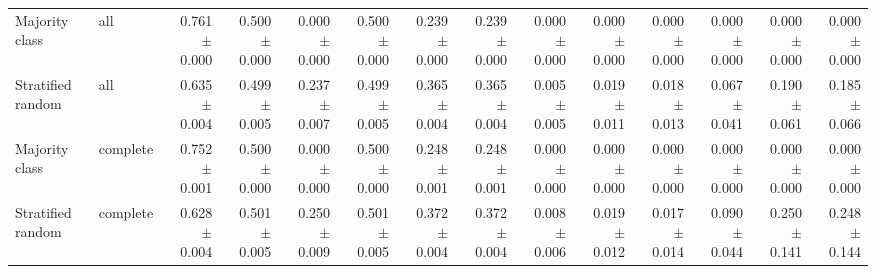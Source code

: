 \begin{table}[t]
{\begin{tabular}{llrrrrrrrrrrrr}
Majority class & all & 0.761 $\pm$ 0.000 & 0.500 $\pm$ 0.000 & 0.000 $\pm$ 0.000 & 0.500 $\pm$ 0.000 & 0.239 $\pm$ 0.000 & 0.239 $\pm$ 0.000 & 0.000 $\pm$ 0.000 & 0.000 $\pm$ 0.000 & 0.000 $\pm$ 0.000 & 0.000 $\pm$ 0.000 & 0.000 $\pm$ 0.000 & 0.000 $\pm$ 0.000 \\
Stratified random & all & 0.635 $\pm$ 0.004 & 0.499 $\pm$ 0.005 & 0.237 $\pm$ 0.007 & 0.499 $\pm$ 0.005 & 0.365 $\pm$ 0.004 & 0.365 $\pm$ 0.004 & 0.005 $\pm$ 0.005 & 0.019 $\pm$ 0.011 & 0.018 $\pm$ 0.013 & 0.067 $\pm$ 0.041 & 0.190 $\pm$ 0.061 & 0.185 $\pm$ 0.066 \\
Majority class & complete & 0.752 $\pm$ 0.001 & 0.500 $\pm$ 0.000 & 0.000 $\pm$ 0.000 & 0.500 $\pm$ 0.000 & 0.248 $\pm$ 0.001 & 0.248 $\pm$ 0.001 & 0.000 $\pm$ 0.000 & 0.000 $\pm$ 0.000 & 0.000 $\pm$ 0.000 & 0.000 $\pm$ 0.000 & 0.000 $\pm$ 0.000 & 0.000 $\pm$ 0.000 \\
Stratified random & complete & 0.628 $\pm$ 0.004 & 0.501 $\pm$ 0.005 & 0.250 $\pm$ 0.009 & 0.501 $\pm$ 0.005 & 0.372 $\pm$ 0.004 & 0.372 $\pm$ 0.004 & 0.008 $\pm$ 0.006 & 0.019 $\pm$ 0.012 & 0.017 $\pm$ 0.014 & 0.090 $\pm$ 0.044 & 0.250 $\pm$ 0.141 & 0.248 $\pm$ 0.144 \\
\bottomrule
\end{tabular}}
\end{table}
